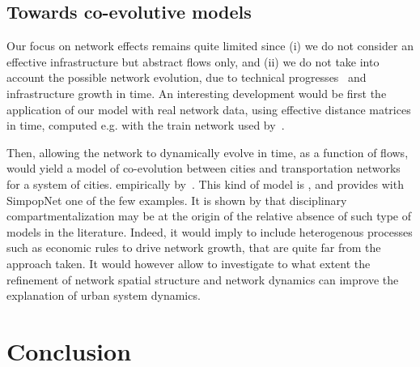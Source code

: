 \documentclass[Royal,sageh,times]{sagej}
\begin{document}
\subsection*{Towards co-evolutive models}

Our focus on network effects remains quite limited since (i) we do not consider an effective infrastructure but abstract flows only, and (ii) we do not take into account the possible network evolution, due to technical progresses~\citep{bretagnolle2000long} and infrastructure growth in time. An interesting development would be first the application of our model with real network data, using effective distance matrices in time, computed e.g. with the train network used by~\cite{thevenin2013mapping}.

Then, allowing the network to dynamically evolve in time, as a function of flows, would yield a model of co-evolution between cities and transportation networks for a system of cities.  empirically by~\cite{bretagnolle:tel-00459720}. This kind of model is , and \cite{schmitt2014modelisation} provides with  SimpopNet  one of the few examples. It is shown by \cite{raimbault2016models} that disciplinary compartmentalization may be at the origin of the relative absence of such type of models in the literature. Indeed, it would imply to include heterogenous processes such as economic rules to drive network growth, that are quite far from the approach taken. It would however allow to investigate to what extent the refinement of network spatial structure and network dynamics can improve the explanation of urban system dynamics.






\section*{Conclusion}
\end{document}
